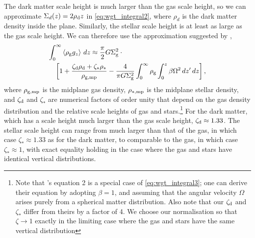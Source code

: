 \documentclass[useAMS,usenatbib]{mn2e}
\newcommand{\rhogmp}{\rho_{\rm g,mp}}
\begin{document}
The dark matter scale height is much larger than the gas scale height, so we can approximate $\Sigma_d(z)  = 2 \rho_{\rm d} z$ in \autoref{eq:wgt_integral2}, where $\rho_d$ is the dark matter density inside the plane. Similarly, the stellar scale height is at least as large as the gas scale height. We can therefore use the approximation suggested by \citet{ostriker10a},
\begin{eqnarray}
\lefteqn{\int_0^\infty \left\langle \rho_{\rm g} g_z\right\rangle \, dz \approx \frac{\pi}{2} G \Sigma_{\rm g}^2 \cdot {}}
\nonumber \\
& & 
\left[1 + \frac{\zeta_{\rm d} \rho_{\rm d} + \zeta_* \rho_*}{\rhogmp}
- \frac{4}{\pi G \Sigma_{\rm g}^2} \int_0^\infty \rho_{\rm g} \int_0^z \beta\Omega^2\, dz' \, dz
\right],
\label{eq:wgt_integral3}
\end{eqnarray}
where $\rhogmp$ is the midplane gas density, $\rho_{*,\rm mp}$ is the midplane stellar density, and $\zeta_{\rm d}$ and $\zeta_*$ are numerical factors of order unity that depend on the gas density distribution and the relative scale heights of gas and stars.\footnote{Note that \citet{ostriker11a}'s equation 2 is a special case of \autoref{eq:wgt_integral3}; one can derive their equation by adopting $\beta=1$, and assuming that the angular velocity $\Omega$ arises purely from a spherical matter distribution. Also note that our $\zeta_{\rm d}$ and $\zeta_*$ differ from theirs by a factor of 4. We choose our normalisation so that $\zeta \rightarrow 1$ exactly in the limiting case where the gas and stars have the same vertical distribution} For the dark matter, which has a scale height much larger than the gas scale height, $\zeta_{\rm d}\approx 1.33$. The stellar scale height can range from much larger than that of the gas, in which case $\zeta_* \approx 1.33$ as for the dark matter, to comparable to the gas, in which case $\zeta_* \approx 1$, with exact equality holding in the case where the gas and stars have identical vertical distributions.
\end{document}
